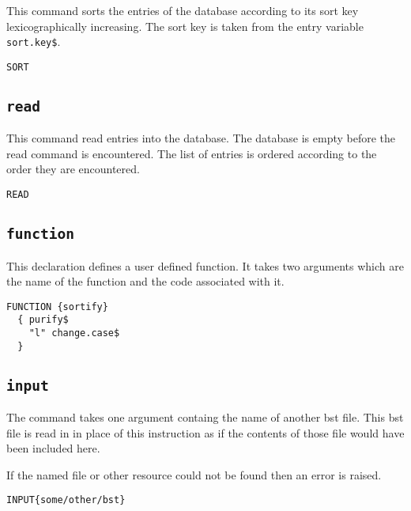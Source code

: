 This command sorts the entries of the database according to its sort
key lexicographically increasing. The sort key is taken from the entry
variable \texttt{sort.key\$}.

\begin{lstlisting}[language=bst]
  SORT
\end{lstlisting}


\subsection{\texttt{read}}

This command read entries into the database. The database is empty
before the read command is encountered. The list of entries is ordered
according to the order they are encountered.

\begin{lstlisting}[language=bst]
  READ
\end{lstlisting}


\subsection{\texttt{function}}

This declaration defines a user defined function. It takes two
arguments which are the name of the function and the code associated
with it.

\INCOMPLETE

\begin{lstlisting}[language=bst]
  FUNCTION {sortify}
  { purify$
    "l" change.case$
  }
\end{lstlisting}


\subsection{\texttt{input}}

The command takes one argument containg the name of another bst file.
This bst file is read in in place of this instruction as if the
contents of those file would have been included here. 

If the named file or other resource could not be found then an error
is raised.

\begin{lstlisting}[language=bst]
  INPUT{some/other/bst}
\end{lstlisting}


